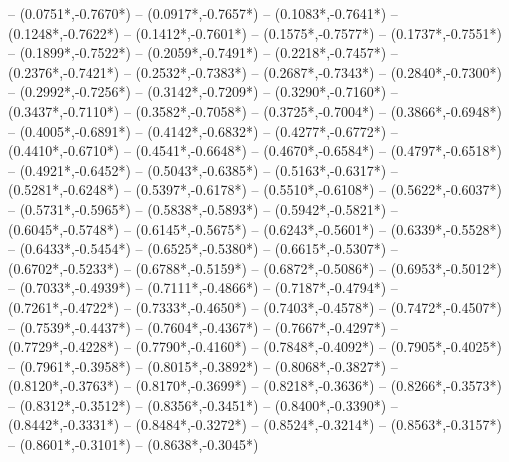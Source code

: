 {	-- ({0.0751*\dx},{-0.7670*\dy})
	-- ({0.0917*\dx},{-0.7657*\dy})
	-- ({0.1083*\dx},{-0.7641*\dy})
	-- ({0.1248*\dx},{-0.7622*\dy})
	-- ({0.1412*\dx},{-0.7601*\dy})
	-- ({0.1575*\dx},{-0.7577*\dy})
	-- ({0.1737*\dx},{-0.7551*\dy})
	-- ({0.1899*\dx},{-0.7522*\dy})
	-- ({0.2059*\dx},{-0.7491*\dy})
	-- ({0.2218*\dx},{-0.7457*\dy})
	-- ({0.2376*\dx},{-0.7421*\dy})
	-- ({0.2532*\dx},{-0.7383*\dy})
	-- ({0.2687*\dx},{-0.7343*\dy})
	-- ({0.2840*\dx},{-0.7300*\dy})
	-- ({0.2992*\dx},{-0.7256*\dy})
	-- ({0.3142*\dx},{-0.7209*\dy})
	-- ({0.3290*\dx},{-0.7160*\dy})
	-- ({0.3437*\dx},{-0.7110*\dy})
	-- ({0.3582*\dx},{-0.7058*\dy})
	-- ({0.3725*\dx},{-0.7004*\dy})
	-- ({0.3866*\dx},{-0.6948*\dy})
	-- ({0.4005*\dx},{-0.6891*\dy})
	-- ({0.4142*\dx},{-0.6832*\dy})
	-- ({0.4277*\dx},{-0.6772*\dy})
	-- ({0.4410*\dx},{-0.6710*\dy})
	-- ({0.4541*\dx},{-0.6648*\dy})
	-- ({0.4670*\dx},{-0.6584*\dy})
	-- ({0.4797*\dx},{-0.6518*\dy})
	-- ({0.4921*\dx},{-0.6452*\dy})
	-- ({0.5043*\dx},{-0.6385*\dy})
	-- ({0.5163*\dx},{-0.6317*\dy})
	-- ({0.5281*\dx},{-0.6248*\dy})
	-- ({0.5397*\dx},{-0.6178*\dy})
	-- ({0.5510*\dx},{-0.6108*\dy})
	-- ({0.5622*\dx},{-0.6037*\dy})
	-- ({0.5731*\dx},{-0.5965*\dy})
	-- ({0.5838*\dx},{-0.5893*\dy})
	-- ({0.5942*\dx},{-0.5821*\dy})
	-- ({0.6045*\dx},{-0.5748*\dy})
	-- ({0.6145*\dx},{-0.5675*\dy})
	-- ({0.6243*\dx},{-0.5601*\dy})
	-- ({0.6339*\dx},{-0.5528*\dy})
	-- ({0.6433*\dx},{-0.5454*\dy})
	-- ({0.6525*\dx},{-0.5380*\dy})
	-- ({0.6615*\dx},{-0.5307*\dy})
	-- ({0.6702*\dx},{-0.5233*\dy})
	-- ({0.6788*\dx},{-0.5159*\dy})
	-- ({0.6872*\dx},{-0.5086*\dy})
	-- ({0.6953*\dx},{-0.5012*\dy})
	-- ({0.7033*\dx},{-0.4939*\dy})
	-- ({0.7111*\dx},{-0.4866*\dy})
	-- ({0.7187*\dx},{-0.4794*\dy})
	-- ({0.7261*\dx},{-0.4722*\dy})
	-- ({0.7333*\dx},{-0.4650*\dy})
	-- ({0.7403*\dx},{-0.4578*\dy})
	-- ({0.7472*\dx},{-0.4507*\dy})
	-- ({0.7539*\dx},{-0.4437*\dy})
	-- ({0.7604*\dx},{-0.4367*\dy})
	-- ({0.7667*\dx},{-0.4297*\dy})
	-- ({0.7729*\dx},{-0.4228*\dy})
	-- ({0.7790*\dx},{-0.4160*\dy})
	-- ({0.7848*\dx},{-0.4092*\dy})
	-- ({0.7905*\dx},{-0.4025*\dy})
	-- ({0.7961*\dx},{-0.3958*\dy})
	-- ({0.8015*\dx},{-0.3892*\dy})
	-- ({0.8068*\dx},{-0.3827*\dy})
	-- ({0.8120*\dx},{-0.3763*\dy})
	-- ({0.8170*\dx},{-0.3699*\dy})
	-- ({0.8218*\dx},{-0.3636*\dy})
	-- ({0.8266*\dx},{-0.3573*\dy})
	-- ({0.8312*\dx},{-0.3512*\dy})
	-- ({0.8356*\dx},{-0.3451*\dy})
	-- ({0.8400*\dx},{-0.3390*\dy})
	-- ({0.8442*\dx},{-0.3331*\dy})
	-- ({0.8484*\dx},{-0.3272*\dy})
	-- ({0.8524*\dx},{-0.3214*\dy})
	-- ({0.8563*\dx},{-0.3157*\dy})
	-- ({0.8601*\dx},{-0.3101*\dy})
	-- ({0.8638*\dx},{-0.3045*\dy})
}
